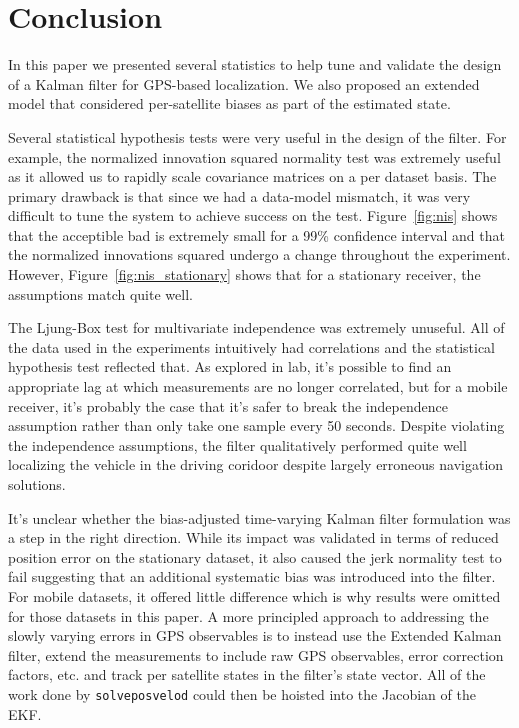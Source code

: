 \section{Conclusion}\label{sec:conclusion}
In this paper we presented several statistics to help tune and validate the design of a Kalman filter for GPS-based localization.  We also proposed an extended model that considered per-satellite biases as part of the estimated state.

Several statistical hypothesis tests were very useful in the design of the filter.  For example, the normalized innovation squared normality test was extremely useful as it allowed us to rapidly scale covariance matrices on a per dataset basis.  The primary drawback is that since we had a data-model mismatch, it was very difficult to tune the system to achieve success on the test.  Figure~\ref{fig:nis} shows that the acceptible bad is extremely small for a 99\% confidence interval and that the normalized innovations squared undergo a change throughout the experiment.  However, Figure~\ref{fig:nis_stationary} shows that for a stationary receiver, the assumptions match quite well.

The Ljung-Box test for multivariate independence was extremely unuseful.  All of the data used in the experiments intuitively had correlations and the statistical hypothesis test reflected that.  As explored in lab, it's possible to find an appropriate lag at which measurements are no longer correlated, but for a mobile receiver, it's probably the case that it's safer to break the independence assumption rather than only take one sample every 50 seconds.  Despite violating the independence assumptions, the filter qualitatively performed quite well localizing the vehicle in the driving coridoor despite largely erroneous navigation solutions.

It's unclear whether the bias-adjusted time-varying Kalman filter formulation was a step in the right direction.  While its impact was validated in terms of reduced position error on the stationary dataset, it also caused the jerk normality test to fail suggesting that an additional systematic bias was introduced into the filter.  For mobile datasets, it offered little difference which is why results were omitted for those datasets in this paper.  A more principled approach to addressing the slowly varying errors in GPS observables is to instead use the Extended Kalman filter, extend the measurements to include raw GPS observables, error correction factors, etc. and track per satellite states in the filter's state vector.  All of the work done by \texttt{solveposvelod} could then be hoisted into the Jacobian of the EKF.
